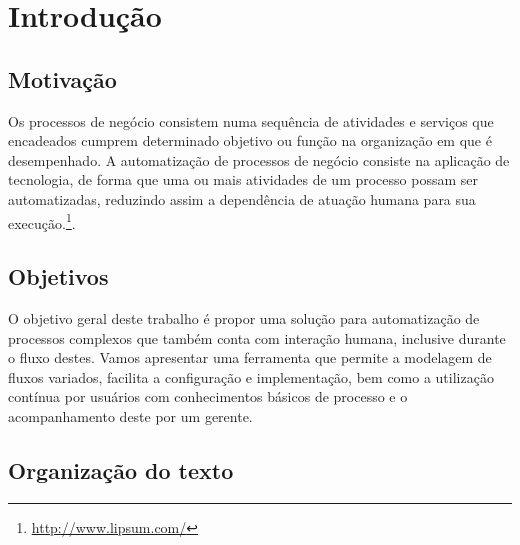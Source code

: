 \chapter{Introdução}\label{chp:introducao}

\section{Motivação}\label{sec:introducao-motivacao}
Os processos de negócio consistem numa sequência de atividades e serviços que  encadeados cumprem determinado objetivo ou função na organização em que é desempenhado. A automatização de processos de negócio consiste na aplicação de tecnologia, de forma que uma ou mais atividades de um processo possam ser automatizadas, reduzindo assim a dependência de atuação humana para sua execução.\footnote{\url{http://www.lipsum.com/}}.

\section{Objetivos}\label{sec:introducao-objetivo}
O objetivo geral deste trabalho é propor uma solução para automatização de processos complexos que também conta com interação humana, inclusive durante o fluxo destes. Vamos apresentar uma ferramenta que permite a modelagem de fluxos variados, facilita a configuração e implementação, bem como a utilização contínua por usuários com conhecimentos básicos de processo e o acompanhamento deste por um gerente.

\section{Organização do texto}\label{sec:introducao-organizacao_texto}